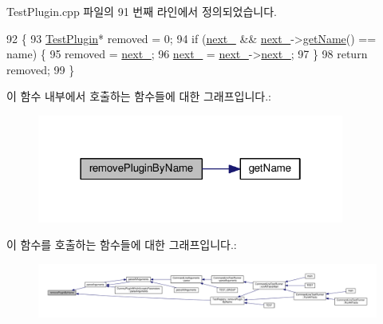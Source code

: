 Test\+Plugin.\+cpp 파일의 91 번째 라인에서 정의되었습니다.


\begin{DoxyCode}
92 \{
93     \hyperlink{class_test_plugin}{TestPlugin}* removed = 0;
94     \textcolor{keywordflow}{if} (\hyperlink{class_test_plugin_a9461650e936ee3765377081fb8bc15dc}{next\_} && \hyperlink{class_test_plugin_a9461650e936ee3765377081fb8bc15dc}{next\_}->\hyperlink{class_test_plugin_a6a7955846f821ee0cdc9c17e38041b11}{getName}() == name) \{
95         removed = \hyperlink{class_test_plugin_a9461650e936ee3765377081fb8bc15dc}{next\_};
96         \hyperlink{class_test_plugin_a9461650e936ee3765377081fb8bc15dc}{next\_} = \hyperlink{class_test_plugin_a9461650e936ee3765377081fb8bc15dc}{next\_}->\hyperlink{class_test_plugin_a9461650e936ee3765377081fb8bc15dc}{next\_};
97     \}
98     \textcolor{keywordflow}{return} removed;
99 \}
\end{DoxyCode}


이 함수 내부에서 호출하는 함수들에 대한 그래프입니다.\+:
\nopagebreak
\begin{figure}[H]
\begin{center}
\leavevmode
\includegraphics[width=286pt]{class_test_plugin_a75abbb424eeb5b1466272ab22dd2cfcf_cgraph}
\end{center}
\end{figure}




이 함수를 호출하는 함수들에 대한 그래프입니다.\+:
\nopagebreak
\begin{figure}[H]
\begin{center}
\leavevmode
\includegraphics[width=350pt]{class_test_plugin_a75abbb424eeb5b1466272ab22dd2cfcf_icgraph}
\end{center}
\end{figure}


